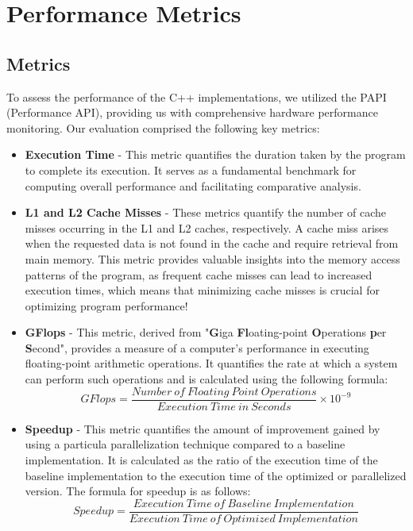 \section{Performance Metrics}
\label{sec:metrics}

\subsection{Metrics}
To assess the performance of the C++ implementations, we 
utilized the PAPI (Performance API), providing us with comprehensive 
hardware performance monitoring. Our evaluation comprised the 
following key metrics:

\begin{itemize}
\item \textbf{Execution Time} - This metric quantifies the 
duration taken by the program to 
complete its execution. It serves as a fundamental 
benchmark for computing overall performance 
and facilitating comparative analysis.

\item \textbf{L1 and L2 Cache Misses} - These metrics 
quantify the number of cache misses occurring in the 
L1 and L2 caches, respectively. A cache miss arises 
when the requested data is not found in the cache and 
require retrieval from main memory. This metric 
provides valuable insights into the memory access patterns
of the program, as frequent cache misses can lead to 
increased execution times, which means that 
minimizing cache misses is crucial for optimizing 
program performance!

\item \textbf{GFlops} - This metric, derived from "\textbf{G}iga 
\textbf{Fl}oating-point \textbf{O}perations \textbf{p}er \textbf{S}econd", provides a measure of a 
computer's performance in executing floating-point arithmetic 
operations. It quantifies the rate at which a system can 
perform such operations and is calculated using the following formula:
    \begin{equation}
        GFlops = \frac{Number\ of\ Floating\ Point\ Operations}{Execution\ Time\ in\ Seconds} \times 10^{-9}
    \end{equation}

\item \textbf{Speedup} - This metric quantifies the 
amount of improvement gained by using a particula 
parallelization technique compared to a baseline
implementation. It is calculated as the ratio of
the execution time of the baseline implementation
to the execution time of the optimized or parallelized
version. The formula for speedup is as follows:
    \begin{equation}
        Speedup = \frac{Execution\ Time\ of\ Baseline\ Implementation}{Execution\ Time\ of\ Optimized\ Implementation}
    \end{equation}



\end{itemize}
